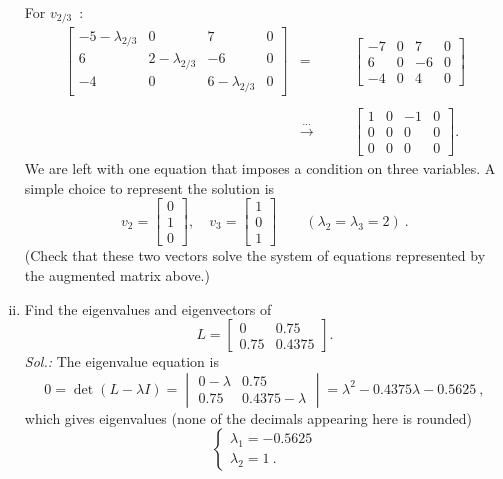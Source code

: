 \begin{example}
\begin{enumerate}[(i)]
		For $v_{2/3}$~:
		\[\begin{array}{ccc}
		\left[\begin{array}{ccc|c}
		-5-\lambda_{2/3} & 0 & 7 & 0 \\
		6 & 2-\lambda_{2/3} & -6 & 0\\ 
		-4 & 0 & 6-\lambda_{2/3} & 0
		\end{array}\right] & = \qquad & \left[\begin{array}{ccc|c}
		-7 & 0 & 7 & 0 \\
		6 & 0 & -6 & 0\\ 
		-4 & 0 & 4 & 0
		\end{array}\right] \\ & & \\
		& \stackrel{\dots}{\rightarrow} \qquad & 
		\left[\begin{array}{ccc|c}
		1 & 0 & -1 & 0 \\
		0 & 0 & 0 & 0\\ 
		0 & 0 & 0 & 0
		\end{array}\right].
		\end{array}	\]
		We are left with one equation that imposes a condition on three variables. A simple choice to represent the solution is
		\[v_2 = \begin{bmatrix} 0 \\ 1 \\ 0 \end{bmatrix},
		  \quad v_3 = \begin{bmatrix} 1 \\ 0 \\ 1 \end{bmatrix}
		 \qquad (\lambda_2 = \lambda_3 = 2) \:. \]
		 (Check that these two vectors solve the system of equations represented by the augmented matrix above.)
	\item Find the eigenvalues and eigenvectors of
		\[ L = \begin{bmatrix}
		0 & 0.75 \\ 0.75 & 0.4375 
		\end{bmatrix}. \]
		{\it Sol.:}
		The eigenvalue equation is 
		\[ 0 = \det (L-\lambda I) = \begin{vmatrix}  
		0 - \lambda & 0.75 \\ 0.75 & 0.4375 - \lambda
		\end{vmatrix} = \lambda^2 - 0.4375\lambda - 0.5625 \:, \]
		which gives eigenvalues (none of the decimals appearing here is rounded)
		\[ \begin{cases} \lambda_1 = -0.5625 \\ \lambda_2 = 1 \:. \end{cases} \]
		

\end{enumerate}
\end{example}
